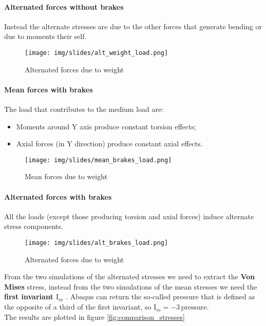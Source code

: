 \documentclass[a4paper,12pt]{article}
\begin{document}
\paragraph*{Alternated forces without brakes\\}
Instead the alternate stresses are due to the other forces that generate bending or due to moments their self.

\begin{figure}[H]
\centering
\caption{Alternated forces due to weight}
\texttt{[image: img/slides/alt\_weight\_load.png]}
\end{figure}
\paragraph*{Mean forces with brakes\\}
The load that contributes to the medium load are:
\begin{itemize}
\item Moments around Y axis produce constant torsion effects;
\item Axial forces (in Y direction) produce constant axial effects.
\end{itemize}

\begin{figure}[H]
\centering
\caption{Mean forces due to weight}
\texttt{[image: img/slides/mean\_brakes\_load.png]}
\end{figure}

\paragraph*{Alternated forces with brakes\\}
All the loads (except those producing torsion and axial forces) induce alternate stress components.

\begin{figure}[H]
\centering
\caption{Alternated forces due to weight}
\texttt{[image: img/slides/alt\_brakes\_load.png]}
\end{figure}

From the two simulations of the alternated stresses we need to extract the \textbf{Von Mises} stress, instead from the two simulations of the mean stresses we need the \textbf{first invariant $\text{I}_m$ }. Abaqus can return the so-called pressure that is defined as the opposite of a third of the first invariant, so $\text{I}_m = - 3 \, \text{pressure}$.\\
The results are plotted in figure \ref{fig:comparison_stresses}
\end{document}
